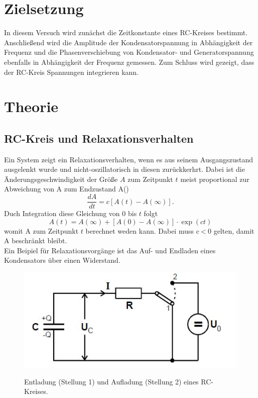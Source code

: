 \section{Zielsetzung}
In diesem Versuch wird zunächst die Zeitkonstante eines RC-Kreises bestimmt.
Anschließend wird die Amplitude der Kondensatorspannung in Abhängigkeit der Frequenz und
die Phasenverschiebung von Kondensator- und Generatorspannung ebenfalls in Abhängigkeit der
Frequenz gemessen. Zum Schluss wird gezeigt, dass der RC-Kreis Spannungen
integrieren kann.

\section{Theorie}
\subsection{RC-Kreis und Relaxationsverhalten}
Ein System zeigt ein Relaxationsverhalten, wenn es aus seinem Ausgangszustand
ausgelenkt wurde und nicht-oszillatorisch in diesen zurückkerhrt. Dabei ist die
Änderungsgeschwindigkeit der Größe $A$ zum Zeitpunkt $t$ meist proportional zur
Abweichung von A zum Endzustand A(\infty)
\begin{equation}
  \frac{dA}{dt} = c[A(t)-A(\infty)].
  \label{eqn:diff1}
\end{equation}
Duch Integration diese Gleichung von 0 bis $t$ folgt
\begin{equation}
  A(t)=A(\infty)+[A(0)-A(\infty)] \cdot \exp{(ct)}
\end{equation}
womit A zum Zeitpunkt $t$ berechnet weden kann.
Dabei muss c$\:$<$\:$0 gelten, damit A beschränkt bleibt. \\

\noindent Ein Beipiel für Relaxationsvorgänge ist das Auf- und Endladen eines Kondensators
über einen Widerstand.
\begin{figure}[H]
  \centering
  \includegraphics[height=5cm]{RC.JPG}
  \caption{Entladung (Stellung 1) und Aufladung (Stellung 2) eines RC-Kreises.}
  \cite{skript}
  \label{fig:RC}
  \end{figure}

